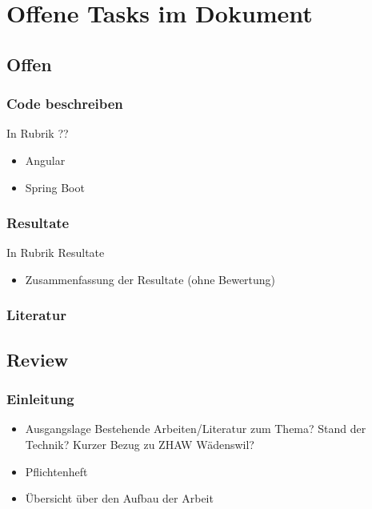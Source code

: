 \documentclass[../main.tex]{subfiles}
\begin{document}
	\section*{Offene Tasks im Dokument}
	\subsection{Offen}
	
	\subsubsection{Code beschreiben}
	In Rubrik ??
	\begin{itemize}
		\item Angular
		\item Spring Boot
	\end{itemize}
	
	\subsubsection{Resultate}
	In Rubrik Resultate
	\begin{itemize}
		\item Zusammenfassung der Resultate (ohne Bewertung)
	\end{itemize}

	\subsubsection{Literatur}
	
	\subsection{Review}
	\subsubsection{Einleitung}
	\begin{itemize}
		\item Ausgangslage
		\subitem Bestehende Arbeiten/Literatur zum Thema?
		\subitem Stand der Technik?
		\subitem Kurzer Bezug zu ZHAW Wädenswil?
		
		\item Pflichtenheft
		\item Übersicht über den Aufbau  der Arbeit
	\end{itemize}
	
\end{document}
